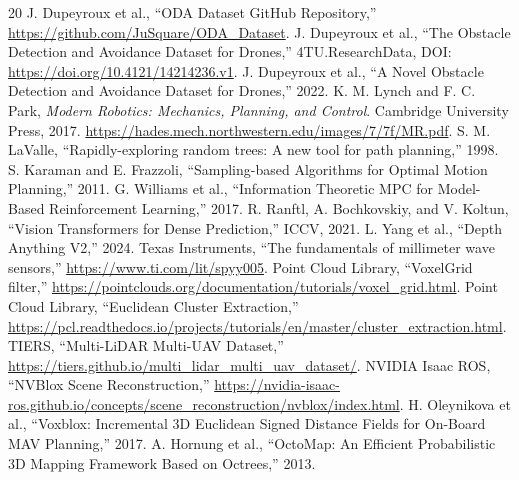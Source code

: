 \documentclass[10pt,a4paper]{article}
\begin{document}
\renewcommand{\refname}{Tài liệu tham khảo}
{\footnotesize
\begin{thebibliography}{20}
\setlength{\itemsep}{1pt}
 J. Dupeyroux et al., ``ODA Dataset GitHub Repository,'' \url{https://github.com/JuSquare/ODA_Dataset}.
 J. Dupeyroux et al., ``The Obstacle Detection and Avoidance Dataset for Drones,'' 4TU.ResearchData, DOI: \url{https://doi.org/10.4121/14214236.v1}.
 J. Dupeyroux et al., ``A Novel Obstacle Detection and Avoidance Dataset for Drones,'' 2022.
 K. M. Lynch and F. C. Park, \textit{Modern Robotics: Mechanics, Planning, and Control}. Cambridge University Press, 2017. \url{https://hades.mech.northwestern.edu/images/7/7f/MR.pdf}.
 S. M. LaValle, ``Rapidly-exploring random trees: A new tool for path planning,'' 1998.
 S. Karaman and E. Frazzoli, ``Sampling-based Algorithms for Optimal Motion Planning,'' 2011.
 G. Williams et al., ``Information Theoretic MPC for Model-Based Reinforcement Learning,'' 2017.
 R. Ranftl, A. Bochkovskiy, and V. Koltun, ``Vision Transformers for Dense Prediction,'' ICCV, 2021.
 L. Yang et al., ``Depth Anything V2,'' 2024.
 Texas Instruments, ``The fundamentals of millimeter wave sensors,'' \url{https://www.ti.com/lit/spyy005}.
 Point Cloud Library, ``VoxelGrid filter,'' \url{https://pointclouds.org/documentation/tutorials/voxel_grid.html}.
 Point Cloud Library, ``Euclidean Cluster Extraction,'' \url{https://pcl.readthedocs.io/projects/tutorials/en/master/cluster_extraction.html}.
 TIERS, ``Multi-LiDAR Multi-UAV Dataset,'' \url{https://tiers.github.io/multi_lidar_multi_uav_dataset/}.
 NVIDIA Isaac ROS, ``NVBlox Scene Reconstruction,'' \url{https://nvidia-isaac-ros.github.io/concepts/scene_reconstruction/nvblox/index.html}.
 H. Oleynikova et al., ``Voxblox: Incremental 3D Euclidean Signed Distance Fields for On-Board MAV Planning,'' 2017.
 A. Hornung et al., ``OctoMap: An Efficient Probabilistic 3D Mapping Framework Based on Octrees,'' 2013.
\end{thebibliography}
}
\end{document}
